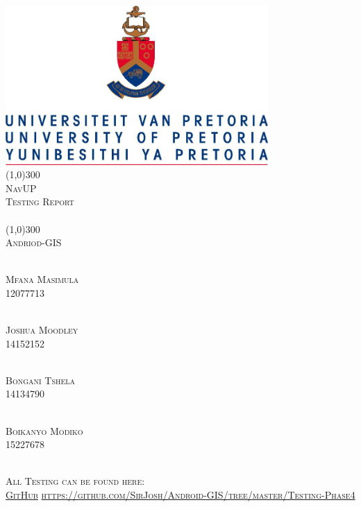 \documentclass[runningheads,a4paper]{article}
\begin{document}
	
	\begin{titlepage}
		\begin{center}
			\includegraphics[width=10cm]{fig/UP.jpg}  \\
			[1cm]
			\line(1,0){300} \\
			[0.3cm]
			\textsc{\Large
				NavUP\\
				Testing Report\\
				\hfill
			}\\
			[0.1cm]
			\line(1,0){300} \\
			[0.7cm]
			\textsc{\Large
				Andriod-GIS
			} \\
		\end{center}
		
		\begin{center}
			\begin{multicols}{2}
				\textsc{\large\\
					Mfana Masimula\\ 
					12077713\\ 
				}
				
				\textsc{\large\\
					Joshua Moodley\\
					14152152\\ 
				}
				
				\textsc{\large\\
					Bongani Tshela\\ 
					14134790\\ 
				}
				
				\textsc{\large\\
					Boikanyo Modiko\\
					15227678\\ 
				}
				
			\end{multicols}
			
			
			\textsc{\\
				All Testing can be found here: \\ \href{https://github.com/SirJosh/Android-GIS/tree/master/Testing-Phase4}{GitHub}
				\url{https://github.com/SirJosh/Android-GIS/tree/master/Testing-Phase4}}
		\end{center}
	\end{titlepage}
	
\end{document}
